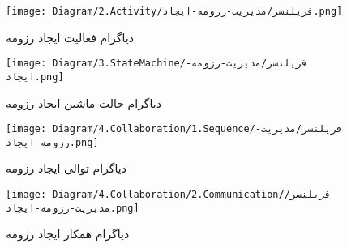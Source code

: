 \begin{figure}[H]
	\centering
	\texttt{[image: Diagram/2.Activity/فریلنسر/مدیریت-رزومه-ایجاد.png]}
	\caption{دیاگرام فعالیت ایجاد رزومه}
	\label{fig:a:ایجاد-رزومه}
\end{figure}
\begin{figure}[H]
\centering
\texttt{[image: Diagram/3.StateMachine/فریلنسر/مدیریت-رزومه-ایجاد.png]}
\caption{دیاگرام حالت ماشین ایجاد رزومه}
\label{fig:sm:ایجاد-رزومه}
\end{figure}
\begin{figure}[H]
	\centering
	\texttt{[image: Diagram/4.Collaboration/1.Sequence/فریلنسر/مدیریت-رزومه-ایجاد.png]}
	\caption{دیاگرام توالی ایجاد رزومه}
	\label{fig:s:ایجاد-رزومه}
\end{figure}
\begin{figure}[H]
	\centering
	\texttt{[image: Diagram/4.Collaboration/2.Communication/فریلنسر/مدیریت-رزومه-ایجاد.png]}
	\caption{دیاگرام همکار ایجاد رزومه}
	\label{fig:c:ایجاد-رزومه}
\end{figure}
